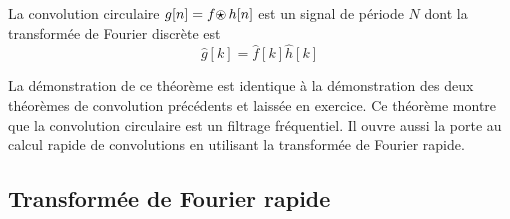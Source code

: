 \begin{theorem} 
\label{circulaire}
La convolution circulaire
$g[n] = f {\mbox{$\odot \!\!\!\!\star~$}} h [n]$ est un signal de p\'eriode $N$ dont la
transform\'ee de Fourier discr\`ete est
\begin{equation}
\hat g[k] = \hat f[k] \hat h[k]
\end{equation}
\end{theorem}

La d\'emonstration de ce th\'eor\`eme est identique \`a la
d\'emonstration des deux th\'eor\`emes de convolution pr\'ec\'edents
et laiss\'ee en exercice.
Ce th\'eor\`eme montre que la convolution circulaire est
un filtrage fr\'equentiel. Il ouvre aussi la porte au
calcul rapide de convolutions en utilisant la
transform\'ee de Fourier rapide.

\subsection{Transform\'ee de Fourier rapide}

